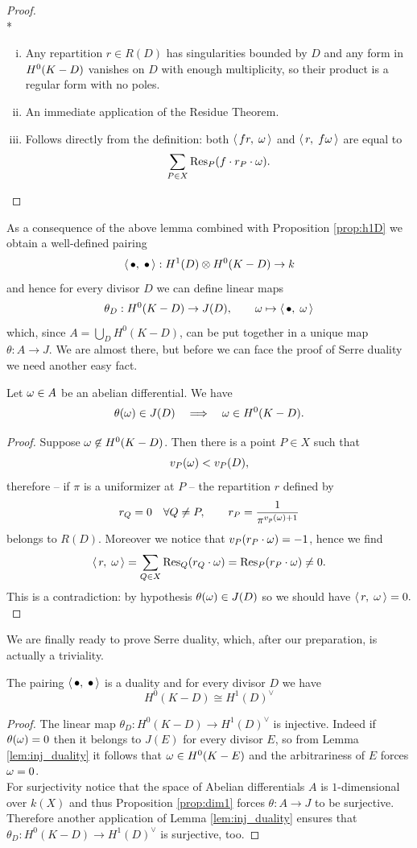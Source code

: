 	\begin{proof}\mbox{}\\*
		\begin{enumerate}[(i)]
			\item Any repartition $r\in R(D)$ has singularities bounded by $D$ and any form in $\nobreak{H^0(K-D)}$ vanishes on $D$ with enough multiplicity, so their product is a regular form with no poles.
			\item An immediate application of the Residue Theorem.
			\item Follows directly from the definition: both $\langle\, fr,\; \omega \,\rangle$ and $\langle\, r,\; f\omega \,\rangle $ are equal to 
			$$ \sum_{P\in X} \operatorname{Res}_P(f \cdot r_P\cdot \omega). $$ 
		\end{enumerate}
	\end{proof}
	As a consequence of the above lemma combined with Proposition \ref{prop:h1D} we obtain a well-defined pairing
	$$ \langle\,\bullet,\;\bullet\,\rangle : H^1(D) \otimes H^0(K-D) \to k $$
	and hence for every divisor $D$ we can define linear maps
	$$ \theta_D : H^0(K-D) \to J(D), \qquad \omega \mapsto \langle\, \bullet,\; \omega \,\rangle $$
	which, since $A=\bigcup_{D} H^0(K-D)$, can be put together in a unique map $\theta:A\to J$.
	We are almost there, but before we can face the proof of Serre duality we need another easy fact.
	\begin{lemm}\label{lem:inj_duality}
		Let $\omega\in A$ be an abelian differential. We have
		$$ \theta(\omega) \in J(D) \quad \Longrightarrow \quad \omega \in H^0(K-D). $$
	\end{lemm}
	\begin{proof}
		Suppose $\omega \not\in H^0(K-D)$. Then there is a point $P\in X$ such that
		$$ v_P(\omega) < v_P(D), $$
		therefore -- if $\pi$ is a uniformizer at $P$ -- the repartition $r$ defined by
		$$ r_Q = 0 \quad \forall Q \neq P, \qquad r_P = \frac{1}{\pi^{v_p(\omega) +1}} $$
		belongs to $R(D)$. Moreover we notice that $v_P(r_P \cdot \omega) = -1$, hence we find
		$$ \langle\, r,\; \omega \,\rangle = \sum_{Q\in X} \operatorname{Res}_Q(r_Q \cdot \omega) = \operatorname{Res}_P(r_P \cdot \omega) \neq 0. $$
		This is a contradiction: by hypothesis $\theta(\omega)\in J(D)$ so we should have $\langle\, r,\; \omega \,\rangle = 0.$ 
	\end{proof}
	We are finally ready to prove Serre duality, which, after our preparation, is actually a triviality.
	\begin{namedtheo}
		The pairing $\langle\,\bullet,\;\bullet\,\rangle$ is a duality and for every divisor $D$ we have 
		$$ H^0(K-D) \cong H^1(D)^{\vee} $$
	\end{namedtheo}
	\begin{proof}
		The linear map $\theta_D : H^0(K-D) \to H^1(D)^{\vee}$ is injective. Indeed if $\theta(\omega) = 0$ then it belongs to $J(E)$ for every divisor $E$, so from Lemma \ref{lem:inj_duality} it follows that $\omega \in H^0(K-E)$ and the arbitrariness of $E$ forces $\omega=0$.\\
		For surjectivity notice that the space of Abelian differentials $A$ is $1$-dimensional over $k(X)$ and thus Proposition \ref{prop:dim1} forces $\theta:A\to J$ to be surjective. Therefore another application of Lemma \ref{lem:inj_duality} ensures that $\theta_D : H^0(K-D) \to H^1(D)^{\vee}$ is surjective, too.
	\end{proof}

